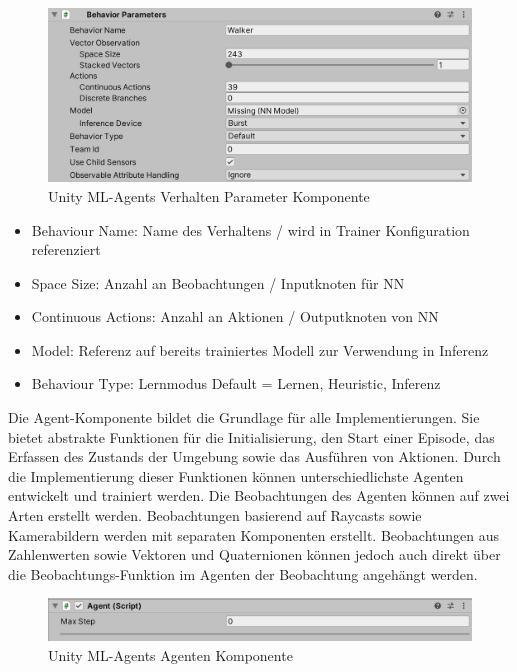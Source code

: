 \begin{figure}[H]
  \centering  
  \includegraphics[scale=0.5]{img/komponente_behavior_parameters}
  \caption{Unity ML-Agents Verhalten Parameter Komponente}
  \label{fig:komponente_behavior_parameters}
\end{figure}

\begin{itemize}
  \item Behaviour Name: Name des Verhaltens / wird in Trainer Konfiguration referenziert
  \item Space Size: Anzahl an Beobachtungen / Inputknoten für NN
  \item Continuous Actions: Anzahl an Aktionen / Outputknoten von NN
  \item Model: Referenz auf bereits trainiertes Modell zur Verwendung in Inferenz
  \item Behaviour Type: Lernmodus Default = Lernen, Heuristic, Inferenz
\end{itemize}

Die Agent-Komponente bildet die Grundlage für alle Implementierungen. Sie bietet abstrakte Funktionen für die Initialisierung, den Start einer Episode, das Erfassen des Zustands der Umgebung sowie das Ausführen von Aktionen. Durch die Implementierung dieser Funktionen können unterschiedlichste Agenten entwickelt und trainiert werden. Die Beobachtungen des Agenten können auf zwei Arten erstellt werden. Beobachtungen basierend auf Raycasts sowie Kamerabildern werden mit separaten Komponenten erstellt. Beobachtungen aus Zahlenwerten sowie Vektoren und Quaternionen können jedoch auch direkt über die Beobachtungs-Funktion im Agenten der Beobachtung angehängt werden.

\begin{figure}[H]
  \centering
  \includegraphics[scale=0.5]{img/komponente_agent}
  \caption{Unity ML-Agents Agenten Komponente}
  \label{fig:komponente_agent}
\end{figure}

